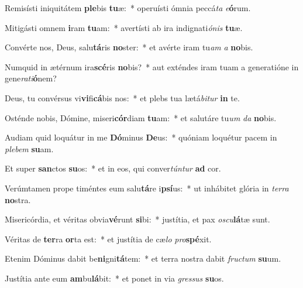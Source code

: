 \item Remisísti iniquitátem \textbf{ple}bis \textbf{tu}æ:~* operuísti ómnia peccá\tinyhspace\textit{ta} \textit{e}\textbf{ó}rum.
\item Mitigásti omnem \textbf{i}ram \textbf{tu}am:~* avertísti ab ira indignati\tinyhspace\textit{ónis} \textbf{tu}æ.
\item Convérte nos, Deus, salu\textbf{tá}ris \textbf{no}ster:~* et avérte iram tu\spurhspace\textit{am} \textit{a} \textbf{no}bis.
\item Numquid in ætérnum ira\textbf{scé}ris \textbf{no}bis?~* aut exténdes iram tuam a generatióne in gene\tinyhspace\textit{rati}\textbf{ó}nem?
\item Deus, tu convérsus vi\textbf{vi}fi\textbf{cá}bis nos:~* et plebs tua lætá\textit{bitur} \textbf{in} te.
\item Osténde nobis, Dómine, miseri\textbf{cór}diam \textbf{tu}am:~* et salutáre tu\tinyhspace\textit{um} \textit{da} \textbf{no}bis.
\item Audiam quid loquátur in me \textbf{Dó}minus \textbf{De}us:~* quóniam loquétur pacem in \textit{plebem} \textbf{su}am.
\item Et super \textbf{san}ctos \textbf{su}os:~* et in eos, qui conver\textit{túntur} \textbf{ad} cor.
\item Verúmtamen prope timéntes eum salu\textbf{tá}re i\textbf{psí}us:~* ut inhábitet glória in \textit{terra} \textbf{no}stra.
\item Misericórdia, et véritas obvia\textbf{vé}runt \textbf{si}bi:~* justítia, et pax \textit{oscu}\textbf{lá}tæ sunt.
\item Véritas de \textbf{ter}ra \textbf{or}ta est:~* et justítia de cæ\textit{lo} \textit{pro}\textbf{spé}xit.
\item Etenim Dóminus dabit be\textbf{ni}gni\textbf{tá}tem:~* et terra nostra dabit \textit{fru\-ctum} \textbf{su}um.
\item Justítia ante eum \textbf{am}bu\textbf{lá}bit:~* et ponet in via \textit{gressus} \textbf{su}os.
